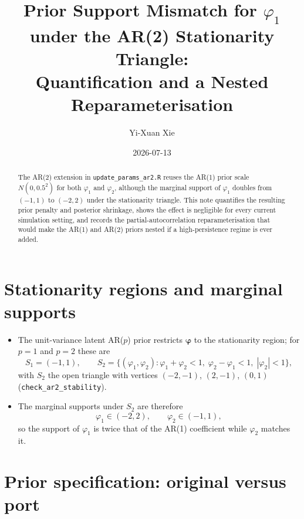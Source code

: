 \documentclass[11pt]{article}
\title{Prior Support Mismatch for $\varphi_1$ under the AR(2)
       Stationarity Triangle:\\ Quantification and a Nested
       Reparameterisation}
\author{Yi-Xuan Xie}
\date{2026-07-13}
\newcommand{\bphi}{\boldsymbol{\varphi}}
\theoremstyle{plain}
\theoremstyle{definition}
\theoremstyle{remark}
\begin{document}
\maketitle

\begin{abstract}
\noindent
The AR(2) extension in \texttt{update\_params\_ar2.R} reuses the AR(1) prior
scale $N(0, 0.5^2)$ for both $\varphi_1$ and $\varphi_2$, although the
marginal support of $\varphi_1$ doubles from $(-1, 1)$ to $(-2, 2)$ under the
stationarity triangle. This note quantifies the resulting prior penalty and
posterior shrinkage, shows the effect is negligible for every current
simulation setting, and records the partial-autocorrelation
reparameterisation that would make the AR(1) and AR(2) priors nested if a
high-persistence regime is ever added.
\end{abstract}

\section{Stationarity regions and marginal supports}\label{sec:regions}

\begin{itemize}
  \item The unit-variance latent AR($p$) prior restricts $\bphi$ to the
        stationarity region; for $p = 1$ and $p = 2$ these are
        \begin{equation}\label{eq:regions}
          S_1 = (-1, 1),
          \qquad
          S_2 = \bigl\{ (\varphi_1, \varphi_2) :
            \varphi_1 + \varphi_2 < 1,\;
            \varphi_2 - \varphi_1 < 1,\;
            |\varphi_2| < 1 \bigr\},
        \end{equation}
        with $S_2$ the open triangle with vertices $(-2, -1)$, $(2, -1)$,
        $(0, 1)$ (\texttt{check\_ar2\_stability}).
  \item The marginal supports under $S_2$ are therefore
        \begin{equation}\label{eq:supports}
          \varphi_1 \in (-2, 2),
          \qquad
          \varphi_2 \in (-1, 1),
        \end{equation}
        so the support of $\varphi_1$ is twice that of the AR(1) coefficient
        while $\varphi_2$ matches it.
\end{itemize}

\section{Prior specification: original versus port}\label{sec:priors}
\end{document}

